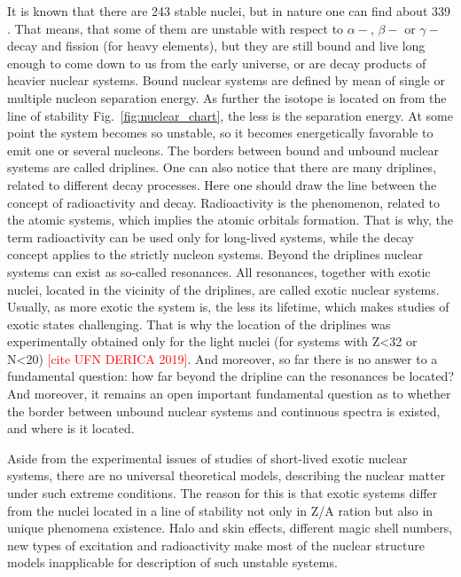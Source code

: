 It is known that there are 243 stable nuclei, but in nature one can find about 339 \cite{Grigorenko:2016}. 
That means, that some of them are unstable with respect to $\alpha-$, $\beta-$ or $\gamma-$decay and fission (for heavy elements), but they are still bound and live long enough to come down to us from the early universe, or are decay products of heavier nuclear systems. 
Bound nuclear systems are defined by mean of single or multiple nucleon separation energy.
As further the isotope is located on from the line of stability Fig.\ \ref{fig:nuclear_chart}, the less is the separation energy.
At some point the system becomes so unstable, so it becomes energetically favorable to emit one or several nucleons.
The borders between bound and unbound nuclear systems are called driplines.
One can also notice that there are many driplines, related to different decay processes.
Here one should draw the line between the concept of radioactivity and decay. 
Radioactivity is the phenomenon, related to the atomic systems, which implies the atomic orbitals formation.
That is why, the term radioactivity can be used only for long-lived systems, while the decay concept applies to the strictly nucleon systems.
Beyond the driplines nuclear systems can exist as so-called resonances. 
All resonances, together with exotic nuclei, located in the vicinity of the driplines, are called exotic nuclear systems.
Usually, as more exotic the system is, the less its lifetime, which makes studies of exotic states challenging. 
That is why the location of the driplines was experimentally obtained only for the light nuclei (for systems with Z<32 or N<20) \textcolor{red}{[cite UFN DERICA 2019]}.
And moreover, so far there is no answer to a fundamental question: how far beyond the dripline can the resonances be located? 
And moreover, it remains an open important fundamental question as to whether the border between unbound nuclear systems and continuous spectra is existed, and where is it located.

Aside from the experimental issues of studies of short-lived exotic nuclear systems, there are no universal theoretical models, describing the nuclear matter under such extreme conditions.
The reason for this is that exotic systems differ from the nuclei located in a line of stability not only in Z/A ration but also in unique phenomena existence.
Halo and skin effects, different magic shell numbers, new types of excitation and radioactivity make most of the nuclear structure models inapplicable for description of such unstable systems.

